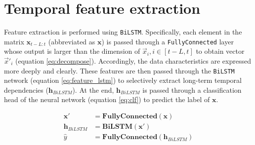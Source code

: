 \section{Temporal feature extraction}


Feature extraction is performed using \verb|BiLSTM|. Specifically, each element in the matrix $\mathbf{x}_{t-L:t}$ (abbreviated as $\mathbf{x}$) is passed through a \verb|FullyConnected| layer whose output is larger than the dimension of $\vec x_i, i\in[t-L, t]$ to obtain vector $\vec x'_i$ (equation \ref{eq:decompose}). Accordingly, the data characteristics are expressed more deeply and clearly. These features are then passed through the \verb|BiLSTM| network (equation \ref{eq:feature_lstm}) to selectively extract long-term temporal dependencies ($\mathbf{h}_{BiLSTM}$). At the end, $\mathbf{h}_{BiLSTM}$ is passed through a classification head of the neural network (equation \ref{eq:clf}) to predict the label of $\mathbf{x}$.

\begin{align}
    \mathbf{x'} &= \mathbf{FullyConnected}\left( \mathbf{x} \right) \label{eq:decompose}\\
    \mathbf{h}_{BiLSTM} &= \mathbf{BiLSTM}\left( \mathbf{x'} \right) \label{eq:feature_lstm}\\
    \hat y &= \mathbf{FullyConnected}\left( \mathbf{h}_{BiLSTM} \right) \label{eq:clf}
\end{align}


